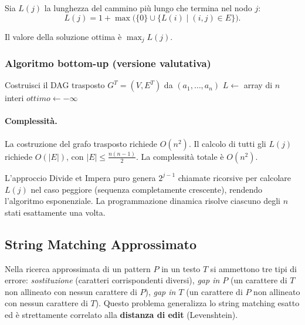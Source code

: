 Sia $L(j)$ la lunghezza del cammino più lungo che termina nel nodo $j$:
\[
L(j) = 1 + \max\bigl(\{0\} \cup \{L(i) \mid (i,j) \in E\}\bigr).
\]

Il valore della soluzione ottima è $\max_j L(j)$.

\subsubsection{Algoritmo bottom-up (versione valutativa)}

\begin{algorithm}[H]
\caption{\textsc{MSCresc-V}$(a_1, \ldots, a_n)$}

Costruisci il DAG trasposto $G^T = (V, E^T)$ da $(a_1, \ldots, a_n)$\;
$L \leftarrow$ array di $n$ interi 
$\mathit{ottimo} \leftarrow -\infty$\;

\end{algorithm}

\paragraph{Complessità.}
La costruzione del grafo trasposto richiede $O(n^2)$. Il calcolo di tutti gli
$L(j)$ richiede $O(|E|)$, con $|E| \leq \frac{n(n-1)}{2}$.
La complessità totale è $O(n^2)$.

\begin{hardnote}
L'approccio Divide et Impera puro genera $2^{j-1}$ chiamate ricorsive per calcolare
$L(j)$ nel caso peggiore (sequenza completamente crescente), rendendo l'algoritmo
esponenziale. La programmazione dinamica risolve ciascuno degli $n$ stati
esattamente una volta.
\end{hardnote}

\subsection{String Matching Approssimato}

\begin{softnote}
Nella ricerca approssimata di un pattern $P$ in un testo $T$ si ammettono tre tipi
di errore: \emph{sostituzione} (caratteri corrispondenti diversi),
\emph{gap in $P$} (un carattere di $T$ non allineato con nessun carattere di $P$),
\emph{gap in $T$} (un carattere di $P$ non allineato con nessun carattere di $T$).
Questo problema generalizza lo string matching esatto ed è strettamente correlato
alla \textbf{distanza di edit} (Levenshtein).
\end{softnote}

